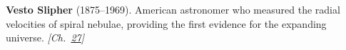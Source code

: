 \textbf{Vesto Slipher} (1875–1969). American astronomer who measured the radial velocities of spiral nebulae, providing the first evidence for the expanding universe. \emph{[Ch.~\hyperref[ch:planetaryskycolors]{27}]}

